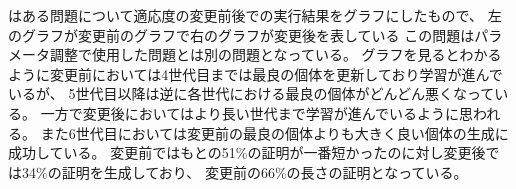 
はある問題について適応度の変更前後での実行結果をグラフにしたもので、
左のグラフが変更前のグラフで右のグラフが変更後を表している
この問題はパラメータ調整で使用した問題とは別の問題となっている。
グラフを見るとわかるように変更前においては4世代目までは最良の個体を更新しており学習が進んでいるが、
5世代目以降は逆に各世代における最良の個体がどんどん悪くなっている。
一方で変更後においてはより長い世代まで学習が進んでいるように思われる。
また6世代目においては変更前の最良の個体よりも大きく良い個体の生成に成功している。
変更前ではもとの51\%の証明が一番短かったのに対し変更後では34\%の証明を生成しており、
変更前の66\%の長さの証明となっている。


